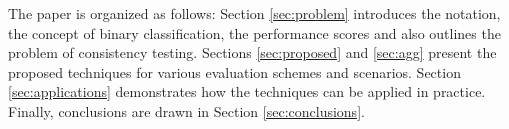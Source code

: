 \documentclass[5p, final]{elsarticle}
\begin{document}
The paper is organized as follows: Section \ref{sec:problem} introduces the notation, the concept of binary classification, the performance scores and also outlines the problem of consistency testing. Sections \ref{sec:proposed} and \ref{sec:agg} present the proposed techniques for various evaluation schemes and scenarios. Section \ref{sec:applications} demonstrates how the techniques can be applied in practice. Finally, conclusions are drawn in Section \ref{sec:conclusions}.








\end{document}

